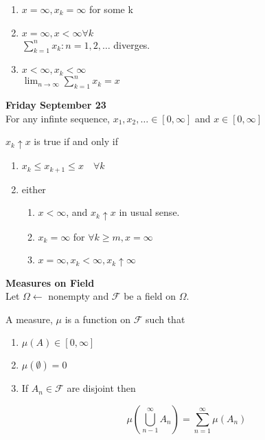 \documentclass[11pt,fleqn]{book} %
\begin{document}
	\begin{enumerate}
		\item $x = \infty, x_k = \infty$ for some k
		\item $x = \infty, x < \infty \forall k$\\
			$\sum^n_{k=1} x_k: n = 1, 2, \dots$ diverges.
		\item $x< \infty, x_k < \infty $\\

		$\lim_{n\rightarrow \infty} \sum^n_{k=1} x_k = x$

	\end{enumerate}

\textbf{Friday September 23}\\


	For any infinte sequence, $x_1, x_2, \dots \in [0, \infty] $ and $x\in [0,\infty]$

	$x_k \uparrow x $ is true if and only if
	
	\begin{enumerate}
		\item $x_k \leq x_{k+1} \leq x \quad \forall k$
		\item either
			\begin{enumerate}
				\item $x < \infty$, and $x_k \uparrow x$ in usual sense.
				\item $x_k = \infty$ for $\forall k\geq m, x = \infty$
				\item $x = \infty, x_k < \infty, x_k \uparrow \infty$
			\end{enumerate}
	\end{enumerate}

	\textbf{Measures on Field}\\

	Let $\Omega \leftarrow$ nonempty and $\mathcal{F}$ be a field on $\Omega$.


	\begin{definition}
		A measure, $\mu$ is a function on $\mathcal{F}$ such that 

	\begin{enumerate}
		\item $\mu(A) \in [0, \infty]$
		\item $\mu(\emptyset) = 0$
		\item If $A_n \in \mathcal{F}$ are disjoint then 

		$$\mu(\bigcup^\infty_{n-1} A_n)  = \displaystyle \sum^\infty_{n=1} \mu(A_n)$$ 
	\end{enumerate}
\end{definition}
\end{document}
